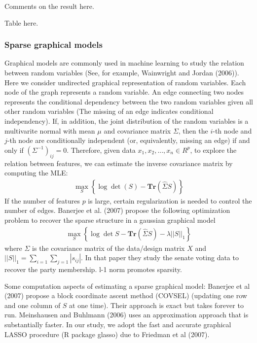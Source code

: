 \documentclass[11pt]{article}
\newcommand{\1}[1]{{\mathbf 1}\left\{#1\right\}}        %
\def\lp{\left(}
\def\rp{\right)}
\begin{document}
Comments on the result here. 


Table here.

\subsubsection{Sparse graphical models}
Graphical models are commonly used in machine learning to study the relation between random variables (See, for example, Wainwright and Jordan (2006)). Here we consider undirected graphical representation of random variables. Each node of the graph represents a random variable. An edge connecting two nodes represents the conditional dependency between the two random variables given all other random variables (The missing of an edge indicates conditional independency). If, in addition, the joint distribution of the random variables is a multivarite normal with mean $\mu$ and covariance matrix $\Sigma$, then the $i$-th node and $j$-th node are conditionally independent (or, equivalently, missing an edge) if and only if $(\Sigma^{-1})_{ij} = 0$. Therefore, given data $x_1,x_2,...,x_n\in R^p$, to explore the relation between features, we can estimate the inverse covariance matrix by computing the MLE:   
\begin{align}
\label{eq:mle}
\max_S \left\{  \log \det \lp S\rp - \textbf{Tr}( \hat{\Sigma}S)  \right\}
\end{align}
If the number of features $p$ is large, certain regularization is needed to control the number of edges. Banerjee et al. (2007) propose the following optimization problem to recover the sparse structure in a gaussian graphical model
\begin{align}
\label{eq:gLasso}
\max_S \left\{ \log \det S - \textbf{Tr} \lp \hat{\Sigma}S \rp - \lambda ||S||_1 \right\}
\end{align}
where $\Sigma$ is the covariance matrix of the data/design matrix $X$ and $||S||_1 = \sum_{i=1}\sum_{j=1} |s_{ij}|$. In that paper they study the senate voting data to recover the party membership. l-1 norm promotes sparsity. 

Some computation aspects of estimating a sparse graphical model: Banerjee et al (2007) propose a block coordinate ascent method (COVSEL) (updating one row and one column of $S$ at one time). Their approach is exact but takes forever to run. Meinshausen and Buhlmann (2006) uses an approximation approach that is substantially faster. In our study, we adopt the fast and accurate graphical LASSO procedure (R package glasso) due to Friedman et al (2007).  
\end{document}
